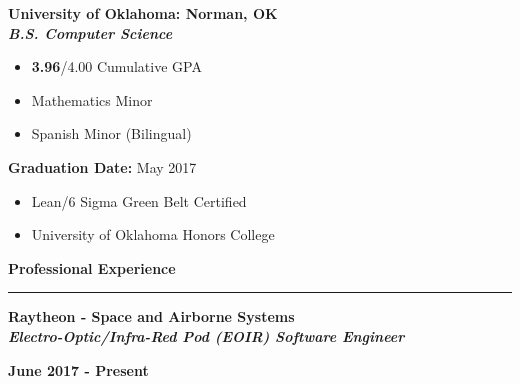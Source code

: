 \documentclass[10pt,letterpaper]{article}
\begin{document}
\begin{minipage}[t]{0.5\textwidth}
        \begin{flushleft}
                \textbf{University of Oklahoma: Norman, OK}\\
                \textbf{\textit{B.S. Computer Science}}

                \begin{itemize}[noitemsep,topsep=0pt]
                        \setlength\itemsep{-0.10em}
                        \item \textbf{3.96}/4.00 Cumulative GPA
                        \item Mathematics Minor
                        \item Spanish Minor (Bilingual)
                \end{itemize}

        \end{flushleft}
\end{minipage}
\begin{minipage}[t]{0.47\textwidth}
        \begin{flushright}
                \textbf{Graduation Date:} May 2017

                \begin{itemize}[noitemsep,topsep=14pt]
                        \item Lean/6 Sigma Green Belt Certified
                        \item University of Oklahoma Honors College
                \end{itemize}

        \end{flushright}
\end{minipage}

\medskip

\begin{large}
        \textbf{Professional Experience}
\end{large}

\smallskip \hrule \smallskip

\begin{minipage}[t]{0.53\textwidth}
        \begin{flushleft}
                \textbf{Raytheon - Space and Airborne Systems}\\
                \textbf{\textit{Electro-Optic/Infra-Red Pod (EOIR) Software Engineer}}\\
        \end{flushleft}
\end{minipage}
\begin{minipage}[t]{0.44\textwidth}
        \begin{flushright}
                \textbf{June 2017 - Present}
        \end{flushright}
\end{minipage}
\end{document}
